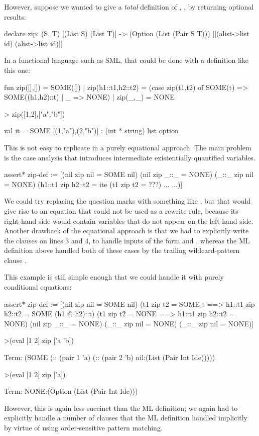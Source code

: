 However, suppose we wanted to give a \emph{total} definition of , \egnsp, by returning optional results:
\begin{tcAthena}
declare zip: (S, T) [(List S) (List T)] -> (Option (List (Pair S T)))
                           [[(alist->list id) (alist->list id)]]
\end{tcAthena}
In a functional language such as SML, that could be done with a definition like this one:
\begin{tcAthenaWithNumbers}
fun zip([],[]) = SOME([])
  | zip(h1::t1,h2::t2) =
      (case zip(t1,t2) of
         SOME(t) => SOME((h1,h2)::t)
       | _ => NONE)
  | zip(_,_) = NONE

> zip([1,2],["a","b"])

val it = SOME [(1,"a"),(2,"b")] : (int * string) list option
\end{tcAthenaWithNumbers}
This is not easy to replicate in a purely equational approach. The main problem is the case analysis that introduces
intermediate existentially quantified variables.
\begin{tcAthenaWithNumbers}
assert* zip-def :=
  [(nil zip nil = SOME nil)
   (nil zip _::_ = NONE)
   (_::_ zip nil = NONE)
   (h1::t1 zip h2::t2 = ite (t1 zip t2 = ???) ... ...)]
\end{tcAthenaWithNumbers}
We could try replacing the question marks with something like , but that would give rise
to an equation that could not be used as a rewrite rule, because its right-hand side would
contain variables that do not appear on the left-hand side. Another drawback of the equational
approach is that we had to explicitly write the clauses on lines 3 and 4, to handle inputs of the form 
and , whereas the ML definition above handled both of these cases by the trailing wildcard-pattern clause
.

This example is still simple enough that we could handle it with purely conditional equations:
\begin{tcAthena}
assert* zip-def :=
   [(nil zip nil = SOME nil) 
    (t1 zip t2 = SOME t ==> h1::t1 zip h2::t2 = SOME (h1 @ h2)::t)
    (t1 zip t2 = NONE ==> h1::t1 zip h2::t2 = NONE)
    (nil zip _::_ = NONE)
    (_::_ zip nil = NONE)
    (_::_ zip nil = NONE)]

>(eval [1 2] zip ['a 'b])

Term: (SOME (:: (pair 1 'a)
                (:: (pair 2 'b)
                    nil:(List (Pair Int Ide)))))

>(eval [1 2] zip ['a])

Term: NONE:(Option (List (Pair Int Ide)))
\end{tcAthena}
However, this is again less succinct than the ML definition; we again had to explicitly handle a number of clauses
that the ML definition handled implicitly by virtue of using order-sensitive pattern matching. 

